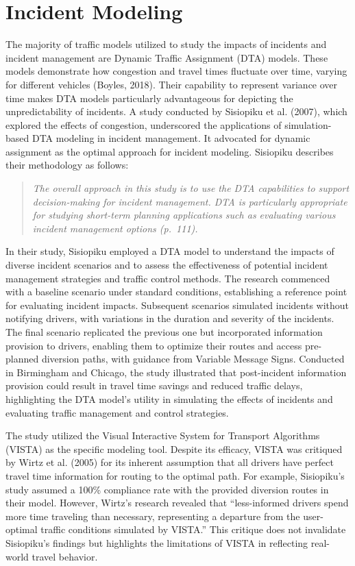 \documentclass[fancy, oneside, mastersfancy, ms]{byuthesis}
\begin{document}
\hypertarget{sec-lit_inc_mod}{%
\section{Incident Modeling}\label{sec-lit_inc_mod}}

The majority of traffic models utilized to study the impacts of
incidents and incident management are Dynamic Traffic Assignment (DTA)
models. These models demonstrate how congestion and travel times
fluctuate over time, varying for different vehicles (Boyles, 2018).
Their capability to represent variance over time makes DTA models
particularly advantageous for depicting the unpredictability of
incidents. A study conducted by Sisiopiku et al. (2007), which explored
the effects of congestion, underscored the applications of
simulation-based DTA modeling in incident management. It advocated for
dynamic assignment as the optimal approach for incident modeling.
Sisiopiku describes their methodology as follows:

\begin{quote}
\emph{The overall approach in this study is to use the DTA capabilities
to support decision-making for incident management. DTA is particularly
appropriate for studying short-term planning applications such as
evaluating various incident management options (p.~111).}
\end{quote}

In their study, Sisiopiku employed a DTA model to understand the impacts
of diverse incident scenarios and to assess the effectiveness of
potential incident management strategies and traffic control methods.
The research commenced with a baseline scenario under standard
conditions, establishing a reference point for evaluating incident
impacts. Subsequent scenarios simulated incidents without notifying
drivers, with variations in the duration and severity of the incidents.
The final scenario replicated the previous one but incorporated
information provision to drivers, enabling them to optimize their routes
and access pre-planned diversion paths, with guidance from Variable
Message Signs. Conducted in Birmingham and Chicago, the study
illustrated that post-incident information provision could result in
travel time savings and reduced traffic delays, highlighting the DTA
model's utility in simulating the effects of incidents and evaluating
traffic management and control strategies.

The study utilized the Visual Interactive System for Transport
Algorithms (VISTA) as the specific modeling tool. Despite its efficacy,
VISTA was critiqued by Wirtz et al. (2005) for its inherent assumption
that all drivers have perfect travel time information for routing to the
optimal path. For example, Sisiopiku's study assumed a 100\% compliance
rate with the provided diversion routes in their model. However, Wirtz's
research revealed that ``less-informed drivers spend more time traveling
than necessary, representing a departure from the user-optimal traffic
conditions simulated by VISTA.'' This critique does not invalidate
Sisiopiku's findings but highlights the limitations of VISTA in
reflecting real-world travel behavior.
\end{document}
